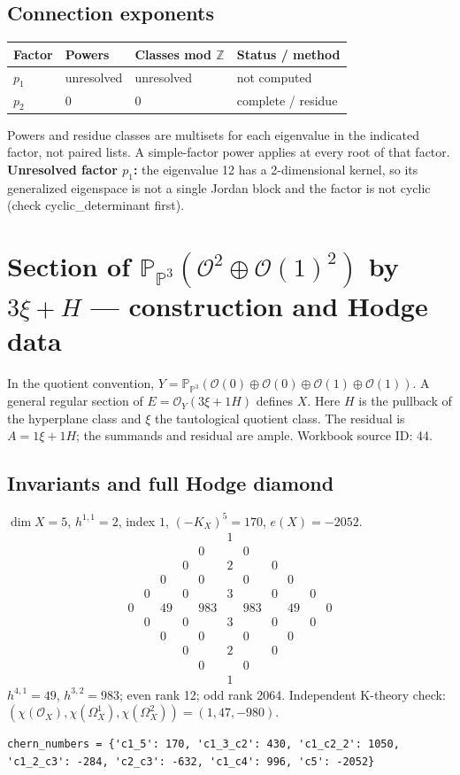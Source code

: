 \documentclass[10pt,a4paper]{article}
\begin{document}
\subsection*{Connection exponents}
\begin{center}\begin{tabular}{llll}\toprule Factor & Powers & Classes mod $\mathbb Z$ & Status / method\\\midrule
$p_{1}$ & unresolved & unresolved & not computed\\
$p_{2}$ & $0$ & $0$ & complete / residue\\
\bottomrule\end{tabular}\end{center}
Powers and residue classes are multisets for each eigenvalue in the indicated factor, not paired lists. A simple-factor power applies at every root of that factor.
\textbf{Unresolved factor $p_{1}$:} the eigenvalue 12 has a 2-dimensional kernel, so its generalized eigenspace is not a single Jordan block and the factor is not cyclic (check cyclic\_determinant first).
\clearpage\section*{Section of $\mathbb P_{\mathbb P^{3}}(\mathcal O^{2}\oplus \mathcal O(1)^{2})$ by $3\xi +H$ --- construction and Hodge data}\label{entry:PB5-044}
In the quotient convention, $Y=\mathbb P_{\mathbb P^{3}}(\mathcal O(0)\oplus\mathcal O(0)\oplus\mathcal O(1)\oplus\mathcal O(1))$.
A general regular section of $E=\mathcal O_Y(3\xi+1H)$ defines $X$.
Here $H$ is the pullback of the hyperplane class and $\xi$ the tautological quotient class. The residual is $A=1\xi+1H$; the summands and residual are ample.
Workbook source ID: 44.
\subsection*{Invariants and full Hodge diamond}
$\dim X=5$, $h^{1,1}=2$, index $1$, $(-K_X)^5=170$, $e(X)=-2052$.
\[\begin{array}{ccccccccccc}&&&&&1&&&&&\\&&&&0&&0&&&&\\&&&0&&2&&0&&&\\&&0&&0&&0&&0&&\\&0&&0&&3&&0&&0&\\0&&49&&983&&983&&49&&0\\&0&&0&&3&&0&&0&\\&&0&&0&&0&&0&&\\&&&0&&2&&0&&&\\&&&&0&&0&&&&\\&&&&&1&&&&&\end{array}\]
$h^{4,1}=49$, $h^{3,2}=983$; even rank 12; odd rank 2064.
Independent K-theory check: $(\chi(\mathcal O_X),\chi(\Omega_X^1),\chi(\Omega_X^2))=(1, 47, -980)$.
\begin{lstlisting}
chern_numbers = {'c1_5': 170, 'c1_3_c2': 430, 'c1_c2_2': 1050, 'c1_2_c3': -284, 'c2_c3': -632, 'c1_c4': 996, 'c5': -2052}
\end{lstlisting}
\end{document}
